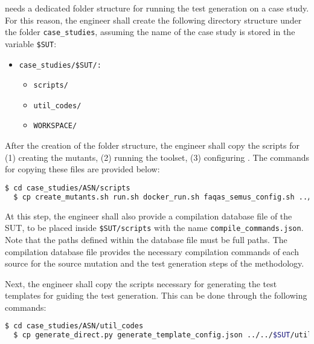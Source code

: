 
\SEMUS needs a dedicated folder structure for running the test generation on a case study. 
For this reason, the engineer shall create the following directory structure under the folder \texttt{case\_studies}, assuming the name of the case study is stored in the variable \texttt{\$SUT}:

\begin{itemize}
	\item \texttt{case\_studies/\$SUT/:}
	\begin{itemize}
		\item \texttt{scripts/}
		\item \texttt{util\_codes/}
		\item \texttt{WORKSPACE/}
	\end{itemize}
\end{itemize}

After the creation of the folder structure, the engineer shall copy the scripts for (1) creating the mutants, (2) running the toolset, (3) configuring \SEMUS. The commands for copying these files are provided below:

\begin{lstlisting}[language=bash]
  $ cd case_studies/ASN/scripts
  $ cp create_mutants.sh run.sh docker_run.sh faqas_semus_config.sh ../../$SUT/scripts
\end{lstlisting}

At this step, the engineer shall also provide a compilation database file of the SUT, to be placed inside \texttt{\$SUT/scripts} with the name \texttt{compile\_commands.json}. Note that the paths defined within the database file must be full paths. The compilation database file provides the necessary compilation commands of each source for the source mutation and the test generation steps of the methodology.

Next, the engineer shall copy the scripts necessary for generating the test templates for guiding the test generation. This can be done through the following commands:

\begin{lstlisting}[language=bash]
  $ cd case_studies/ASN/util_codes
  $ cp generate_direct.py generate_template_config.json ../../$SUT/util_codes
\end{lstlisting}

